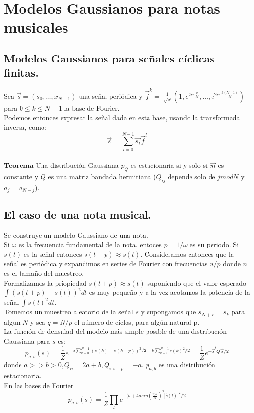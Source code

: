 \documentclass[a4paper]{article}
\begin{document}
\section{\sffamily Modelos Gaussianos para notas musicales}
\subsection{\sffamily Modelos Gaussianos para señales cíclicas finitas.}
Sea $\overrightarrow{s}=(s_{0},\dots,x_{N-1})$ una señal periódica y $\overrightarrow{f}^{k}=\frac{1}{\sqrt[]{N}}(1,e^{2i\pi\frac{k}{N}},\dots,e^{2i\pi\frac{k(N-1)}{N}})$ para $0 \leq k \leq N-1$ la base de Fourier.\\
Podemos entonces expresar la señal dada en esta base, usando la transformada inversa, como: 
$$
\overrightarrow{s}=\sum_{l=0}^{N-1}\overrightarrow{s_{l}}\overrightarrow{f}^{l}
$$\\
\textbf{Teorema} Una distribución Gaussiana $p_{Q}$ es estacionaria si y solo si $\overrightarrow{m}$ es constante y $Q$ es una matriz bandada hermitiana ($Q_{ij}$ depende solo de $j mod N$ y $a_{j}=\overline{a_{N-j}}$).

\subsection{\sffamily El caso de una nota musical.}
Se construye un modelo Gaussiano de una nota.\\

\noindent Si $\omega$ es la frecuencia fundamental de la nota, entoces $p=1/\omega$ es su periodo. Si $s(t)$ es la señal entonces $s(t+p)\approx s(t).$ Consideramos entonces que la señal es periódica y expandimos en series de Fourier con frecuencias $n/p$ donde $n$ es el tamaño del muestreo.\\

\noindent Formalizamos la priopiedad $s(t+p)\approx s(t)$ suponiendo que el valor esperado $\int (s(t+p)-s(t))^{2} dt$ es muy pequeño y a la vez acotamos la potencia de la señal $\int s(t)^{2} dt.$\\

\noindent Tomemos un muestreo aleatorio de la señal $s$ y supongamos que $s_{N+k}=s_{k}$ para algun $N$ y sea $q=N/p$ el número de cíclos, para algún natural p.\\

\noindent La función de densidad del modelo más simple posible de una distribución Gaussiana para $s$ es: 
$$
p_{a,b}(s)=\frac{1}{Z}e^{-a\sum_{k=0}^{N-1}(s(k)-s(k+p))^{2}/2-b\sum_{k=0}^{N-1}s(k)^{2}/2}=\frac{1}{Z}e^{-\overrightarrow{s}^{t}Q\overrightarrow{s}/2}
$$ donde $a >> b > 0, Q_{ii}=2a+b, Q_{i,i+p}=-a.$ $p_{a,b}$ es una distribución estacionaria.\\
En las bases de Fourier 
$$
p_{a,b}(s)=\frac{1}{Z}\prod_{l}e^{-(b+4asin(\frac{\pi pl}{N})^{2}|\hat{s}(l)|^{2}/2}
$$
\end{document}
